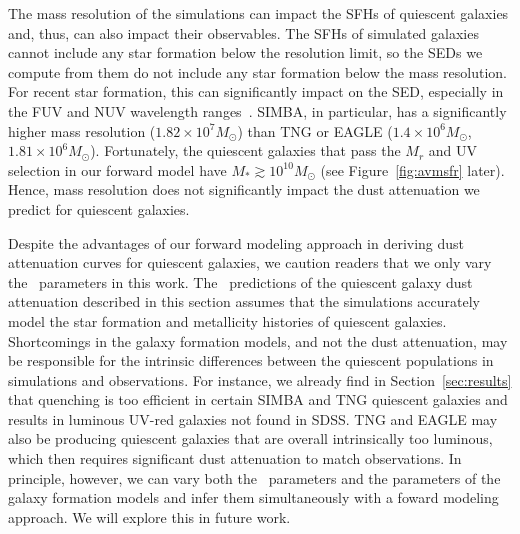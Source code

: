 The mass resolution of the simulations can impact the SFHs of quiescent
galaxies and, thus, can also impact their observables.
The SFHs of simulated galaxies cannot include any star formation below the
resolution limit, so the SEDs we compute from them do not include any star
formation below the mass resolution. 
For recent star formation, this can significantly impact on the SED,
especially in the FUV and NUV wavelength ranges~\citep{leja2017}. 
SIMBA, in particular, has a significantly higher mass resolution
($1.82\times10^7M_\odot$) than TNG or EAGLE ($1.4\times10^{6}M_\odot$,
$1.81\times10^6M_\odot$).
Fortunately, the quiescent galaxies that pass the $M_r$ and UV selection
in our forward model have $M_* \gtrsim 10^{10}M_\odot$ (see
Figure~\ref{fig:avmsfr} later). 
Hence, mass resolution does not significantly impact the dust attenuation
we predict for quiescent galaxies.  

Despite the advantages of our forward modeling approach in deriving dust
attenuation curves for quiescent galaxies, we caution readers
that we only vary the \eda~parameters in this work.     
The \eda~predictions of the quiescent galaxy dust attenuation described in this
section assumes that the simulations accurately model the star formation and
metallicity histories of quiescent galaxies. 
Shortcomings in the galaxy formation models, and not the dust attenuation, may
be responsible for the intrinsic differences between the quiescent populations
in simulations and observations. 
For instance, we already find in Section~\ref{sec:results} that quenching
is too efficient in certain SIMBA and TNG quiescent galaxies and results
in luminous UV-red galaxies not found in SDSS. %
TNG and EAGLE may also be producing quiescent galaxies that are
overall intrinsically too luminous, which then requires significant dust
attenuation to match observations.
In principle, however, we can vary both the \eda~parameters and the parameters
of the galaxy formation models and infer them simultaneously with a foward
modeling approach. 
We will explore this in future work. 
